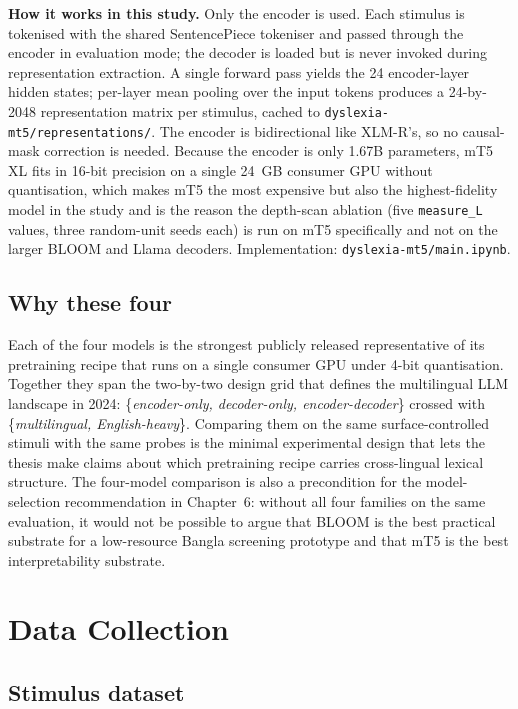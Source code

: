 \textbf{How it works in this study.} Only the encoder is used. Each stimulus is tokenised with the shared SentencePiece tokeniser and passed through the encoder in evaluation mode; the decoder is loaded but is never invoked during representation extraction. A single forward pass yields the 24 encoder-layer hidden states; per-layer mean pooling over the input tokens produces a 24-by-2048 representation matrix per stimulus, cached to \texttt{dyslexia-mt5/representations/}. The encoder is bidirectional like XLM-R's, so no causal-mask correction is needed. Because the encoder is only 1.67B parameters, mT5 XL fits in 16-bit precision on a single 24~GB consumer GPU without quantisation, which makes mT5 the most expensive but also the highest-fidelity model in the study and is the reason the depth-scan ablation (five \texttt{measure\_L} values, three random-unit seeds each) is run on mT5 specifically and not on the larger BLOOM and Llama decoders. Implementation: \texttt{dyslexia-mt5/main.ipynb}.

\subsection{Why these four}

Each of the four models is the strongest publicly released representative of its pretraining recipe that runs on a single consumer GPU under 4-bit quantisation. Together they span the two-by-two design grid that defines the multilingual LLM landscape in 2024: \{\emph{encoder-only, decoder-only, encoder-decoder}\} crossed with \{\emph{multilingual, English-heavy}\}. Comparing them on the same surface-controlled stimuli with the same probes is the minimal experimental design that lets the thesis make claims about which pretraining recipe carries cross-lingual lexical structure. The four-model comparison is also a precondition for the model-selection recommendation in Chapter~6: without all four families on the same evaluation, it would not be possible to argue that BLOOM is the best practical substrate for a low-resource Bangla screening prototype and that mT5 is the best interpretability substrate.

\section{Data Collection}

\subsection{Stimulus dataset}

